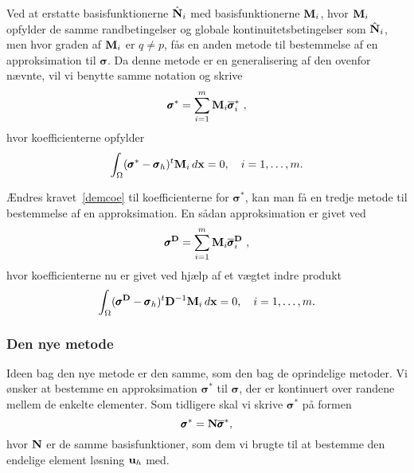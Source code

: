 Ved at erstatte basisfunktionerne $\hat{{\bf N}}_i$ med
basisfunktionerne ${\bf M}_i$, hvor ${\bf M}_i$ opfylder de samme
randbetingelser og globale kontinuitetsbetingelser som $\hat{{\bf
N}}_i$, men hvor graden af ${\bf M}_i$ er $q\not = p$, fås en anden
metode til bestemmelse af en approksimation
til $\pmb\sigma$. Da denne metode er en generalisering af den ovenfor
nævnte, vil vi benytte samme notation og skrive
\begin{equation}  \label{proj1}
  \pmb{\sigma}^{\ast} = \sum_{i=1}^m {\bf M}_i
  \overline{\pmb{\sigma}}^{\ast}_i \ ,
\end{equation}
hvor koefficienterne opfylder
\begin{equation} \label{demcoe}
  \int_{\Omega} (\pmb{\sigma}^{\ast} - \pmb{\sigma}_h)^t
  {\bf M}_i\, d{\bf x}=0, \quad i=1,\ldots,m.
\end{equation}

Ændres kravet~\eqref{demcoe} til koefficienterne for $\pmb{\sigma}^{\ast}$, kan
man få en tredje metode til bestemmelse af en approksimation. En sådan
approksimation er givet ved
\begin{equation} \label{proj2}
  \pmb{\sigma}^{{\bf D}} = \sum_{i=1}^m {\bf M}_i
  \overline{\pmb{\sigma}}^{{\bf D}}_i \ ,
\end{equation}
hvor koefficienterne nu er givet ved hjælp af et vægtet indre produkt
\begin{equation}
  \int_{\Omega} (\pmb{\sigma}^{{\bf D}} - \pmb{\sigma}_h)^t
  {\bf D}^{-1}{\bf M}_i\, d{\bf x}=0, \quad i=1,\ldots,m.
\end{equation}

\subsubsection{Den nye metode}
Ideen bag den nye metode er den samme, som den bag de oprindelige
metoder. Vi ønsker at bestemme en approksimation $\pmb{\sigma}^{\ast}$
til $\pmb{\sigma}$, der er kontinuert over randene mellem de enkelte
elementer. Som tidligere skal vi skrive $\pmb{\sigma}^{\ast}$ på formen
\begin{equation} \label{newform}
  \pmb{\sigma}^{\ast} = {\bf N}\overline{\pmb{\sigma}}^{\ast},
\end{equation}
hvor ${\bf N}$ er de samme basisfunktioner, som dem vi brugte til at
bestemme den endelige element løsning ${\bf u}_h$ med.


